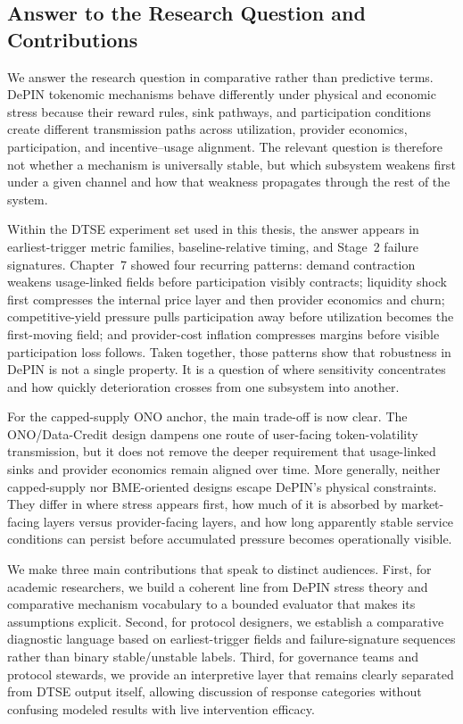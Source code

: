 \subsection{Answer to the Research Question and Contributions}
\label{sec:conclusion}
We answer the research question in comparative rather than predictive terms. DePIN tokenomic mechanisms behave differently under physical and economic stress because their reward rules, sink pathways, and participation conditions create different transmission paths across utilization, provider economics, participation, and incentive--usage alignment. The relevant question is therefore not whether a mechanism is universally stable, but which subsystem weakens first under a given channel and how that weakness propagates through the rest of the system.

Within the DTSE experiment set used in this thesis, the answer appears in earliest-trigger metric families, baseline-relative timing, and Stage~2 failure signatures. Chapter~7 showed four recurring patterns: demand contraction weakens usage-linked fields before participation visibly contracts; liquidity shock first compresses the internal price layer and then provider economics and churn; competitive-yield pressure pulls participation away before utilization becomes the first-moving field; and provider-cost inflation compresses margins before visible participation loss follows. Taken together, those patterns show that robustness in DePIN is not a single property. It is a question of where sensitivity concentrates and how quickly deterioration crosses from one subsystem into another.

For the capped-supply ONO anchor, the main trade-off is now clear. The ONO/Data-Credit design dampens one route of user-facing token-volatility transmission, but it does not remove the deeper requirement that usage-linked sinks and provider economics remain aligned over time. More generally, neither capped-supply nor BME-oriented designs escape DePIN's physical constraints. They differ in where stress appears first, how much of it is absorbed by market-facing layers versus provider-facing layers, and how long apparently stable service conditions can persist before accumulated pressure becomes operationally visible.

We make three main contributions that speak to distinct audiences. First, for academic researchers, we build a coherent line from DePIN stress theory and comparative mechanism vocabulary to a bounded evaluator that makes its assumptions explicit. Second, for protocol designers, we establish a comparative diagnostic language based on earliest-trigger fields and failure-signature sequences rather than binary stable/unstable labels. Third, for governance teams and protocol stewards, we provide an interpretive layer that remains clearly separated from DTSE output itself, allowing discussion of response categories without confusing modeled results with live intervention efficacy.

